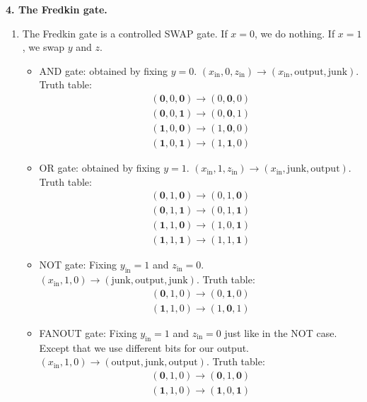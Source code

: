 \documentclass{article}
\theoremstyle{definition}
\begin{document}
\noindent \textbf{4. The Fredkin gate.}

\begin{enumerate}[label=(\alph*)]
	\item The Fredkin gate is a controlled SWAP gate. If $x=0$, we do nothing. If $x=1$, we swap $y$ and $z$. 
	\begin{itemize}
		\item AND gate: obtained by fixing $y=0$. $(x_\text{in},0,z_\text{in}) \to (x_\text{in},\text{output}, \text{junk})$. Truth table:
		\begin{align*}
			(\mathbf{0},0,\mathbf{0}) \to (0,\mathbf{0},0)\\
			(\mathbf{0},0,\mathbf{1}) \to (0,\mathbf{0},1)\\
			(\mathbf{1},0,\mathbf{0}) \to (1,\mathbf{0},0)\\
			(\mathbf{1},0,\mathbf{1}) \to (1,\mathbf{1},0)
		\end{align*}
		\item OR gate: obtained by fixing $y=1$. $(x_\text{in},1,z_\text{in}) \to (x_\text{in},\text{junk}, \text{output})$. Truth table:
		\begin{align*}
			(\mathbf{0},1,\mathbf{0}) \to (0,{1},\mathbf{0})\\
			(\mathbf{0},1,\mathbf{1}) \to (0,{1},\mathbf{1})\\
			(\mathbf{1},1,\mathbf{0}) \to (1,{0},\mathbf{1})\\
			(\mathbf{1},1,\mathbf{1}) \to (1,{1},\mathbf{1})
		\end{align*}
		\item NOT gate:  Fixing $y_\text{in}=1$ and $z_\text{in}=0$. $(x_\text{in},1,0) \to (\text{junk},\text{output}, \text{junk})$. Truth table:
		\begin{align*}
			(\mathbf{0},{1},{0}) \to (0,\mathbf{1},{0})\\
			(\mathbf{1},{1},{0}) \to (1,\mathbf{0},{1})
		\end{align*}
		
		\item FANOUT gate: Fixing $y_\text{in}=1$ and $z_\text{in}=0$ just like in the NOT case. Except that we use different bits for our output.  $(x_\text{in},1,0) \to (\text{output},\text{junk}, \text{output})$. Truth table:
		\begin{align*}
			(\mathbf{0},{1},{0}) \to (\mathbf{0},{1},\mathbf{0})\\
			(\mathbf{1},{1},{0}) \to (\mathbf{1},{0},\mathbf{1})
		\end{align*}
	\end{itemize}


\end{enumerate}
\end{document}
